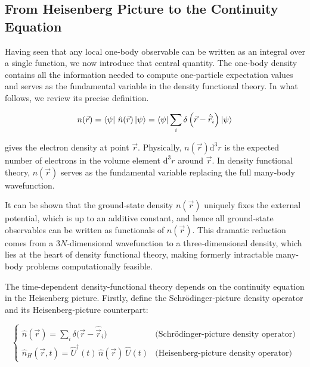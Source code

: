 \subsection{From Heisenberg Picture to the Continuity Equation}

Having seen that any local one‐body observable can be written as an integral over a single function, we now introduce that central quantity. The one‐body density contains all the information needed to compute one‐particle expectation values and serves as the fundamental variable in the density functional theory. In what follows, we review its precise definition.

\begin{equation}
n(\vec{r})
= \bra{\psi}\,\hat n(\vec{r})\ket{\psi}
= \bra{\psi}\sum_i\delta\left(\vec{r} - \hat{\vec{r}}_i\right)\ket{\psi}
\label{one‐body_density}
\end{equation}

gives the electron density at point $\vec{r}$. Physically, $n(\vec{r})\mathrm{d}^3r$ is the expected number of electrons in the volume element $\mathrm{d}^3r$ around $\vec{r}$. In density functional theory, $n(\vec{r})$ serves as the fundamental variable replacing the full many‐body wavefunction.  

It can be shown that the ground‐state density $n(\vec r)$ uniquely fixes the external potential, which is up to an additive constant, and hence all ground‐state observables can be written as functionals of $n(\vec{r})$. This dramatic reduction comes from a 3$N$‐dimensional wavefunction to a three‐dimensional density, which lies at the heart of density functional theory, making formerly intractable many‐body problems computationally feasible.

The time-dependent density-functional theory depends on the continuity equation in the Heisenberg picture. Firstly, define the Schrödinger‐picture density operator and its Heisenberg‐picture counterpart:

\begin{equation}
\begin{cases}
  \hat n(\vec r)
    = \displaystyle\sum_i \delta\bigl(\vec r - \hat{\vec r}_i\bigr)
    & \text{(Schrödinger‐picture density operator)}\\
  \hat n_H(\vec r,t)
    = \hat U^\dagger(t)\,\hat{n}(\vec r)\,\hat U(t)
    & \text{(Heisenberg‐picture density operator)}
\end{cases}
\label{density_op}
\end{equation}

